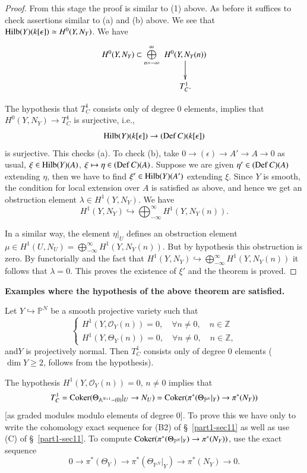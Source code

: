 {\begin{proof}
From this stage the proof is similar to (1) above. As before it
suffices to check assertions similar to (a) and (b) above. We see that
$\Hilb(Y)\break(k[\epsilon])\simeq H^{0}(Y,N_{Y})$. We have
\[
\xymatrix@C=0pt@R=.5cm{
H^{0}(Y,N_{Y})\subset \bigoplus\limits^{\infty}_{n=-\infty} &
H^{0}(Y,N_{Y}(n))\ar[d]\\
& T^{1}_{C}.
}
\]\pageoriginale

The hypothesis that $T^{1}_{C}$ consists only of degree $0$ elements,
implies that $H^{0}(Y,N_{Y})\to T^{1}_{C}$ is surjective, i.e.,
$$
\operatorname{Hilb}(Y)(k[\epsilon])\to (\operatorname{Def} C)(k[\epsilon])
$$
is surjective. This checks (a). To check (b), take $0\to(\epsilon)\to
A'\to A\to 0$ as usual, $\xi\in \operatorname{Hilb}(Y)(A)$, $\xi\mapsto \eta\in
(\operatorname{Def} C)(A)$. Suppose we are given $\eta'\in (\operatorname{Def} C)(A)$ extending
$\eta$, then we have to find $\xi'\in\operatorname{Hilb}(Y)(A')$ extending
$\xi$. Since $Y$ is smooth, the condition for local extension over
$A$ is satisfied as above, and hence we get an obstruction element
$\lambda\in H^{1}(Y,N_{Y})$. We have
$$
H^{1}(Y,N_{Y})\hookrightarrow \bigoplus^{\infty}_{-\infty}H^{1}(Y,N_{Y}(n)).
$$

In a similar way, the element $\eta|_{U}$ defines an obstruction
element $\mu\in
H^{1}(U,N_{U})=\bigoplus\limits^{\infty}_{-\infty}H^{1}(Y,N_{Y}(n))$. But
by hypothesis this obstruction is zero. By functorially and the fact
that $H^{1}(Y,N_{Y})\hookrightarrow
\bigoplus\limits^{\infty}_{-\infty}H^{1}(Y,N_{Y}(n))$ it follows that
$\lambda=0$. This proves the existence of $\xi'$ and the theorem is
proved.
\end{proof}

\noindent
{\bf Examples where the hypothesis of the above theorem are
  satisfied.}

\begin{lemma}\label{part1-lem12.1}
Let $Y\hookrightarrow \mathbb{P}^{N}$ be a smooth projective variety
such that
$$
\begin{cases}
H^{1}(Y,\mathscr{O}_{Y}(n))=0,\quad \forall n\neq 0,\quad n\in
\mathbb{Z}\\
H^{1}(Y,\Theta_{Y}(n))=0,\quad \forall n\neq 0,\quad n\in \mathbb{Z},
\end{cases}
$$
and\pageoriginale $Y$ is projectively normal. Then $T^{1}_{C}$
consists only of degree $0$ elements ($\dim Y\geq 2$, follows from the
hypothesis). 
\end{lemma}

The hypothesis $H^{1}(Y,\mathscr{O}_{Y}(n))=0$, $n\neq 0$ implies that
$$
T^{1}_{C}=\operatorname{Coker} (\Theta_{\mathbb{A}^{N+1}-(0)}|_{U}\to N_{U})=\operatorname{Coker}
(\pi^{\ast}(\Theta_{\mathbb{P}^{N}}|_{Y})\to \pi^{\ast}(N_{Y}))
$$
[as graded modules modulo elements of degree $0$]. To prove this we
have only to write the cohomology exact sequence for (B2) of
\S~\ref{part1-sec11} as well as use (C) of \S~\ref{part1-sec11}. To
compute $\operatorname{Coker} (\pi^{\ast}(\Theta_{\mathbb{P}^{N}}|_{Y})\to
\pi^{\ast}(N_{Y}))$, use the exact sequence
$$
0\to \pi^{\ast}(\Theta_{Y})\to
\pi^{\ast}(\Theta_{\mathbb{P}^{N}}|_{Y})\to \pi^{\ast}(N_{Y})\to 0.
$$

}
